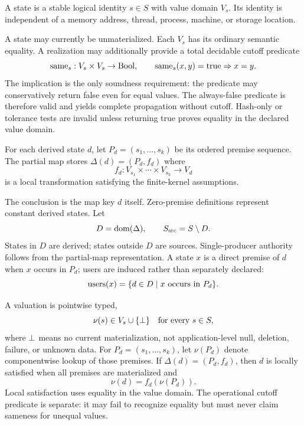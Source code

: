 \begin{definition}[State]\label{def:state}
A state is a stable logical identity $s\in S$ with value domain $V_s$. Its identity is independent of a memory address, thread, process, machine, or storage location.
\end{definition}
A state may currently be unmaterialized. Each $V_s$ has its ordinary semantic equality. A realization may additionally provide a total decidable cutoff predicate
\begin{equation}
\operatorname{same}_s:V_s\times V_s\to\mathrm{Bool},\qquad \operatorname{same}_s(x,y)=\mathrm{true}\Rightarrow x=y.
\label{eq:cutoff}
\end{equation}
The implication is the only soundness requirement: the predicate may conservatively return false even for equal values. The always-false predicate is therefore valid and yields complete propagation without cutoff. Hash-only or tolerance tests are invalid unless returning true proves equality in the declared value domain.

\begin{definition}\label{def:local}
For each derived state $d$, let $P_d=(s_1,\ldots,s_k)$ be its ordered premise sequence. The partial map stores $\Delta(d)=(P_d,f_d)$ where
\[
f_d:V_{s_1}\times\cdots\times V_{s_k}\to V_d
\]
is a local transformation satisfying the finite-kernel assumptions.
\end{definition}
The conclusion is the map key $d$ itself. Zero-premise definitions represent constant derived states. Let
\begin{equation}D=\operatorname{dom}(\Delta),\qquad S_{\mathrm{src}}=S\setminus D.\label{eq:partition}\end{equation}
States in $D$ are derived; states outside $D$ are sources. Single-producer authority follows from the partial-map representation. A state $x$ is a direct premise of $d$ when $x$ occurs in $P_d$; users are induced rather than separately declared:
\begin{equation}\operatorname{users}(x)=\{d\in D\mid x\text{ occurs in }P_d\}.\label{eq:users}\end{equation}

A valuation is pointwise typed,
\begin{equation}\nu(s)\in V_s\cup\{\bot\}\quad\text{for every }s\in S,\label{eq:valuation}\end{equation}
where $\bot$ means no current materialization, not application-level null, deletion, failure, or unknown data. For $P_d=(s_1,\dots,s_k)$, let $\nu(P_d)$ denote componentwise lookup of those premises. If $\Delta(d)=(P_d,f_d)$, then $d$ is locally satisfied when all premises are materialized and
\begin{equation}\nu(d)=f_d(\nu(P_d)).\label{eq:satisfaction}\end{equation}
Local satisfaction uses equality in the value domain. The operational cutoff predicate is separate: it may fail to recognize equality but must never claim sameness for unequal values.

